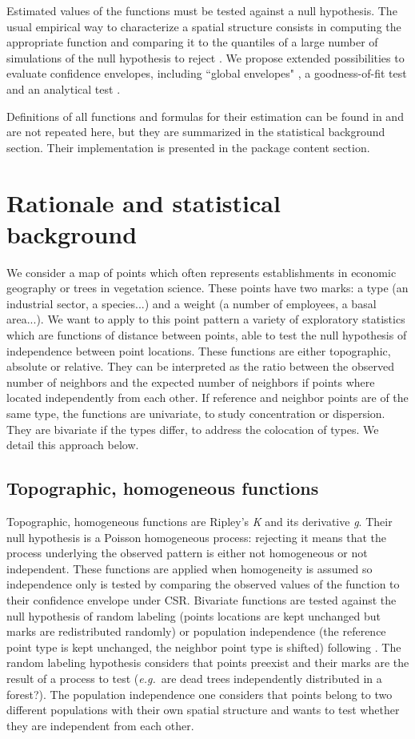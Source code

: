 \documentclass[nojss]{jss}
\begin{document}
Estimated values of the functions must be tested against a null hypothesis. The usual empirical way to characterize a spatial structure consists in computing the appropriate function and comparing it to the quantiles of a large number of simulations of the null hypothesis to reject \citep{Kenkel1988}. We propose extended possibilities to evaluate confidence envelopes, including ``global envelopes" \citep{Duranton2005}, a goodness-of-fit test \citep{Diggle1983} and an analytical test \citep{Lang2010, Marcon2013}.

Definitions of all functions and formulas for their estimation can be found in \cite{Marcon2012a} and are not repeated here, but they are summarized in the statistical background section. Their implementation is presented in the package content section.


\section{Rationale and statistical background}
We consider a map of points which often represents establishments in economic geography or trees in vegetation science. These points have two marks: a type (an industrial sector, a species...) and a weight (a number of employees, a basal area...). We want to apply to this point pattern a variety of exploratory statistics which are functions of distance between points, able to test the null hypothesis of independence between point locations. These functions are either topographic, absolute or relative. They can be interpreted as the ratio between the observed number of neighbors and the expected number of neighbors if points where located independently from each other. 
If reference and neighbor points are of the same type, the functions are univariate, to study concentration or dispersion. They are bivariate if the types differ, to address the colocation of types.
We detail this approach below.


\subsection{Topographic, homogeneous functions}
Topographic, homogeneous functions are Ripley's \emph{K} and its derivative \emph{g}. Their null hypothesis is a Poisson homogeneous process: rejecting it means that the process underlying the observed pattern is either not homogeneous or not independent. These functions are applied when homogeneity is assumed so independence only is tested by comparing the observed values of the function to their confidence envelope under CSR. Bivariate functions are tested against the null hypothesis of random labeling (points locations are kept unchanged but marks are redistributed randomly) or population independence (the reference point type is kept unchanged, the neighbor point type is shifted) following \cite{Goreaud2003}. The random labeling hypothesis considers that points preexist and their marks are the result of a process to test (\emph{e.g.}\ are dead trees independently distributed in a forest?). The population independence one considers that points belong to two different populations with their own spatial structure and wants to test whether they are independent from each other.
\end{document}
